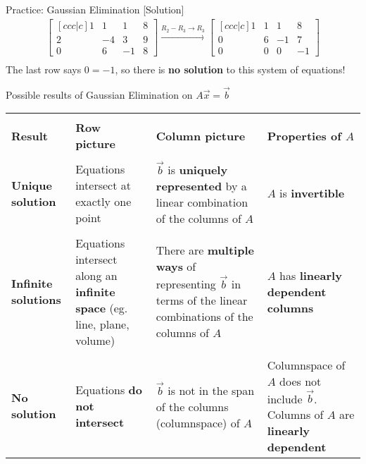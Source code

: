 \begin{frame}{Practice: Gaussian Elimination [Solution]}
    \begin{align*}
        \begin{bmatrix}[c c c | c]
            1 & 1 & 1 & 8 \\
            2 & -4 & 3 & 9 \\
            0 & 6 & -1 & 8
        \end{bmatrix}
        \xrightarrow[]{R_2 - R_3 \to R_3}
        \begin{bmatrix}[c c c | c]
            1 & 1 & 1 & 8 \\
            0 & 6 & -1 & 7 \\
            0 & 0 & 0 & -1
        \end{bmatrix} \\[0.8ex]
    \end{align*}
    The last row says $0 = -1$, so there is \textbf{no solution} to this system of equations!
\end{frame}


\begin{frame}{Possible results of Gaussian Elimination on $A\vec{x} = \vec{b}$}
    \begin{table}
        \fontsize{8.5}{10}\selectfont
        \begin{tabular}{| m{} | m{} | m{} | m{} |}
            \hline &&& \\
            \textbf{Result} & \textbf{Row picture} & \textbf{Column picture} & \textbf{Properties of $A$} \\
            \hline &&& \\
            \textbf{Unique solution} & Equations intersect at exactly one point & $\vec{b}$ is \textbf{uniquely represented} by a linear combination of the columns of $A$ & $A$ is \textbf{invertible} \\
            \hline &&& \\
            \textbf{Infinite solutions} & Equations intersect along an \textbf{infinite space} (eg. line, plane, volume) & There are \textbf{multiple ways} of representing $\vec{b}$ in terms of the linear combinations of the columns of $A$ & $A$ has \textbf{linearly dependent columns} \\
            \hline &&& \\
            \textbf{No solution} & Equations \textbf{do not intersect} & $\vec{b}$ is not in the span of the columns (columnspace) of $A$ & Columnspace of $A$ does not include $\vec{b}$. Columns of $A$ are \textbf{linearly dependent} \\
            \hline
        \end{tabular}
    \end{table}
    
\end{frame}